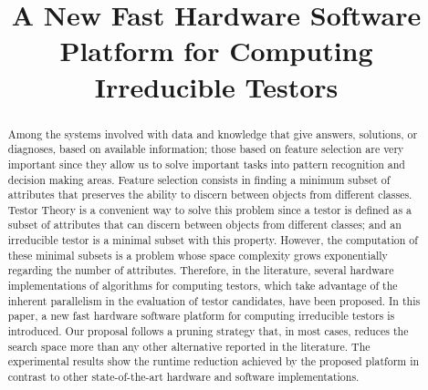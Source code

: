 \documentclass[authoryear,preprint,review,12pt]{elsarticle}
\begin{document}
\begin{frontmatter}



\title{A New Fast Hardware Software Platform for Computing Irreducible Testors}



\address{Computer Science Department}
\address{National Institute for Astrophysics, Optics and Electronics}
\address{Sta. Ma. Tonanzintla, Puebla, 72840, Mexico}

\begin{abstract}
Among the systems involved with data and knowledge that give answers, solutions, or diagnoses, based on 
available information; those based on feature selection are very important since they allow us to solve 
important tasks into pattern recognition and decision making areas. Feature selection consists in 
finding a minimum subset of attributes that preserves the ability to discern between objects from 
different classes. Testor Theory is a convenient way to solve this problem since a testor is defined as
a subset of attributes that can discern between objects from different classes; and an irreducible testor
is a minimal subset with this property. However, the computation of these minimal subsets is a problem 
whose space complexity grows exponentially regarding the number of attributes. Therefore, in the 
literature, several hardware implementations of algorithms for computing testors, which take advantage of
the inherent parallelism in the evaluation of testor candidates, have been proposed. In this paper, a 
new fast hardware software platform for computing irreducible testors is introduced. Our proposal 
follows a pruning strategy that, in most cases, reduces the search space more than any other alternative 
reported in the literature. The experimental results show the runtime reduction achieved by the 
proposed platform in contrast to other state-of-the-art hardware and software implementations.


\end{abstract}
\end{frontmatter}
\end{document}
